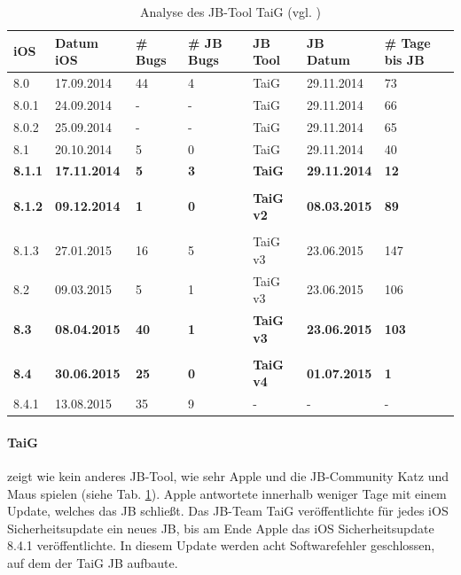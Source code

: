 \begin{table}[htp!]
    \begin{center}
        \begin{tabular}{| p{10mm} | p{22mm} | p{17mm} | p{12mm} | p{18mm} | p{22mm} | p{15mm} |} \hline
            \textbf{iOS} & \textbf{Datum iOS} & \textbf{\# Bugs} & \textbf{\# JB Bugs} & \textbf{JB Tool} & \textbf{JB Datum} & \textbf{\# Tage bis JB} \\ \hline 
8.0 & 17.09.2014 & 44 & 4 & TaiG & 29.11.2014 & 73  \\ \hline
8.0.1 & 24.09.2014	& - & - & TaiG & 29.11.2014 & 66 \\ \hline
8.0.2 & 25.09.2014 & - & -  & TaiG & 29.11.2014 & 65  \\ \hline
8.1 & 20.10.2014 & 5 & 0 & TaiG & 29.11.2014 & 40  \\ \hline
\textbf{8.1.1} & \textbf{17.11.2014} & \textbf{5} & \textbf{3} & \textbf{TaiG} & \textbf{29.11.2014} & \textbf{12}  \\ \hline
 & & & & & & \\ \hline						
\textbf{8.1.2} & \textbf{09.12.2014} & \textbf{1} & \textbf{0} & \textbf{TaiG v2} & \textbf{08.03.2015} & \textbf{89}  \\ \hline
	 & & & & & & \\ \hline						
8.1.3 & 27.01.2015 & 16 & 5 & TaiG v3 & 23.06.2015 & 147  \\ \hline
8.2  & 09.03.2015 & 5 & 1 & TaiG v3 & 23.06.2015 & 106 \\ \hline
\textbf{8.3} &  \textbf{08.04.2015} & \textbf{40} & \textbf{1} & \textbf{TaiG v3} & \textbf{23.06.2015} & \textbf{103}  \\ \hline
		 & & & & & & \\ \hline					
\textbf{8.4} &  \textbf{30.06.2015} & \textbf{25} & \textbf{0} & \textbf{TaiG v4} & \textbf{01.07.2015} & \textbf{1}  \\ \hline
8.4.1 & 13.08.2015 & 35 & 9 & - & - & -   \\ \hline
        \end{tabular} 
        \caption{Analyse des JB-Tool TaiG (vgl. \cite{Apple[7]}) \protect\footnotemark}
        \label{tab:AnalyseTaig}
    \end{center}
\end{table}

\paragraph{TaiG} zeigt wie kein anderes JB-Tool, wie sehr Apple und die JB-Community Katz und Maus spielen  (siehe Tab. \ref{tab:AnalyseTaig}). Apple antwortete innerhalb weniger Tage mit einem Update, welches das JB schließt. Das JB-Team TaiG veröffentlichte für jedes iOS Sicherheitsupdate ein neues JB, bis am Ende Apple das iOS Sicherheitsupdate 8.4.1 veröffentlichte. In diesem Update werden acht Softwarefehler geschlossen, auf dem der TaiG JB aufbaute. 
 
